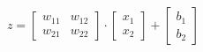 \documentclass[preview]{standalone}
\begin{document}
\begin{align*}
z = \begin{bmatrix} w_{11} & w_{12} \\ w_{21} & w_{22} \end{bmatrix} \cdot \begin{bmatrix} x_1 \\ x_2 \end{bmatrix} + \begin{bmatrix} b_1 \\ b_2 \end{bmatrix}
\end{align*}
\end{document}
